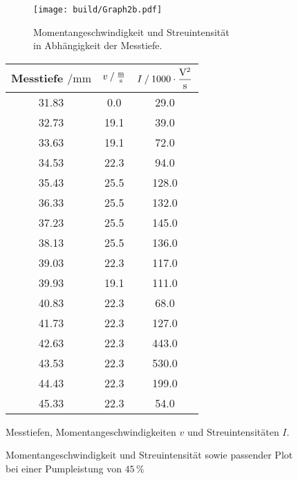 \begin{figure}[H]
    \begin{subfigure}{0.57\textwidth} 
        \centering
        \texttt{[image: build/Graph2b.pdf]} 
        \caption{Momentangeschwindigkeit und Streuintensität \\ in Abhängigkeit der Messtiefe.}
        \label{fig:graph2b}
        \qquad
    \end{subfigure}
    \begin{subtable}{0.43\textwidth}
        \centering
       \begin{tabular}{c c c}
        \toprule 
        {Messtiefe $\mathbin{/} \unit{\milli\meter}$} & {$v \mathbin{/} \unit{\frac{\meter}{\second}} $} & {$I \mathbin{/} 1000 \cdot \unit{\dfrac{\volt^2}{\second}}$}  \\
        \midrule 
            31.83      &  0.0      &29.0    \\
            32.73      &  19.1     &39.0    \\
            33.63      &  19.1     &72.0    \\
            34.53      &  22.3     &94.0    \\
            35.43      &  25.5     &128.0   \\
            36.33      &  25.5     &132.0   \\
            37.23      &  25.5     &145.0   \\
            38.13      &  25.5     &136.0   \\
            39.03      &  22.3     &117.0   \\
            39.93      &  19.1     &111.0   \\
            40.83      &  22.3     &68.0    \\
            41.73      &  22.3     &127.0   \\
            42.63     &  22.3     &443.0   \\
            43.53     &  22.3     &530.0   \\
            44.43     &  22.3     &199.0   \\
            45.33     &  22.3     &54.0    \\
        \bottomrule
    \end{tabular} 
    \caption{Messtiefen, Momentangeschwindigkeiten $v$ und Streuintensitäten $I$.}
     \label{tab:2b}  
 \end{subtable}
 \caption{Momentangeschwindigkeit und Streuintensität sowie passender Plot bei einer Pumpleistung von $45 \,\%$} 
\end{figure}     




